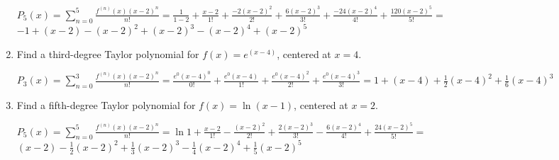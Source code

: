 \documentclass[10pt,letterpaper]{report}
\begin{document}
\begin{enumerate}
    $P_{5}(x) = \sum_{n=0}^{5}{\frac{f^{(n)}(x)(x-2)^{n}}{n!}} = 
    \frac{1}{1-2} + \frac{x-2}{1!} + \frac{-2(x-2)^{2}}{2!} + \frac{6(x-2)^{3}}{3!} + \frac{-24(x-2)^{4}}{4!} + \frac{120(x-2)^{5}}{5!} = $ \\
    
    $-1+\left(x-2\right)-\left(x-2\right)^2+\left(x-2\right)^3-\left(x-2\right)^4 + (x-2)^{5}$ \\
    
  \item{Find a third-degree Taylor polynomial for $f(x) = e^{(x-4)}$, centered at $x=4$. \\}
  
    $P_{3}(x) = \sum_{n=0}^{3}{\frac{f^{(n)}(x)(x-2)^{n}}{n!}} = 
    \frac{e^{0}(x-4)^{0}}{0!} + \frac{e^{0}(x-4)}{1!} + \frac{e^{0}(x-4)^{2}}{2!} + \frac{e^{0}(x-4)^{3}}{3!} = 
    1 + (x-4) + \frac{1}{2}(x-4)^{2} + \frac{1}{6}(x-4)^{3}$ \\
    
  \item{Find a fifth-degree Taylor polynomial for $f(x)=\ln{\left(x-1\right)}$, centered at $x=2$. \\}
  
    $P_{5}(x) = \sum_{n=0}^{5}{\frac{f^{(n)}(x)(x-2)^{n}}{n!}} = 
    \ln{1} + \frac{x-2}{1!} - \frac{(x-2)^{2}}{2!} + \frac{2(x-2)^{3}}{3!} - \frac{6(x-2)^{4}}{4!} + \frac{24(x-2)^{5}}{5!} = $ \\
    
    $\left(x-2\right)-\frac{1}{2}\left(x-2\right)^2+\frac{1}{3}\left(x-2\right)^3-\frac{1}{4}\left(x-2\right)^4+\frac{1}{5}\left(x-2\right)^5$ \\
\end{enumerate}
\end{document}
